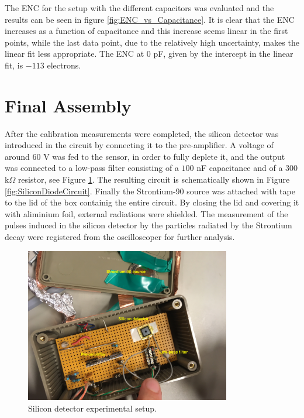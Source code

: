 \documentclass[12pt]{article}
\begin{document}
The ENC for the setup with the different capacitors was evaluated and the results can be seen in figure \ref{fig:ENC_vs_Capacitance}. It is clear that the ENC increases as a function of capacitance and this increase seems linear in the first points, while the last data point, due to the relatively high uncertainty, makes the linear fit less appropriate. The ENC at $0$ pF, given by the intercept in the linear fit, is $-113$ electrons.


\section{Final Assembly}
After the calibration measurements were completed, the silicon detector was introduced in the circuit by connecting it to the pre-amplifier. A voltage of around $60$ V was fed to the sensor, in order to fully deplete it, and the output was connected to a low-pass filter consisting of a $100$ nF capacitance and of a $300$ k$\Omega$ resistor, see Figure \ref{fig:ExperimentalSetup}. The resulting circuit is schematically shown in Figure \ref{fig:SiliconDiodeCircuit}.
Finally the Strontium-90 source was attached with tape to the lid of the box containig the entire circuit. By closing the lid and covering it with aliminium foil, external radiations were shielded. The measurement of the pulses induced in the silicon detector by the particles radiated by the Strontium decay were registered from the oscilloscoper for further analysis.

\begin{figure}[htb]
  \centering
  \includegraphics[width=0.8\textwidth]{./graphics/experimentalSetup}
  \caption{Silicon detector experimental setup.}
  \label{fig:ExperimentalSetup}
\end{figure}
\end{document}
